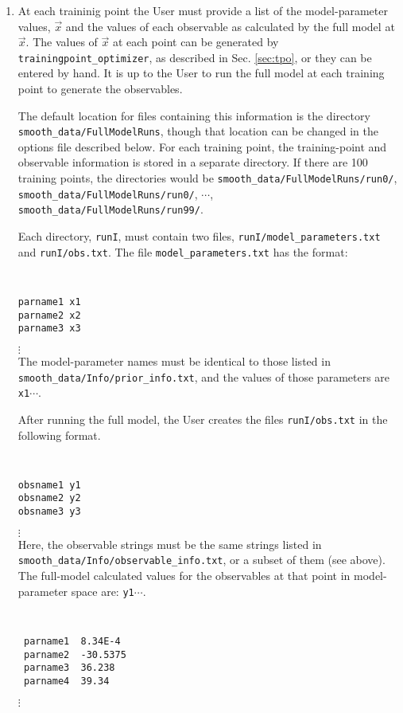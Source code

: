 \documentclass[UserManual.tex]{subfiles}
\begin{document}
\begin{enumerate}
\item At each traininig point the User must provide a list of the model-parameter values, $\vec{x}$ and the values of each observable as calculated by the full model at $\vec{x}$. The values of $\vec{x}$ at each point can be generated by {\tt trainingpoint\_optimizer}, as described in Sec. \ref{sec:tpo}, or they can be entered by hand. It is up to the User to run the full model at each training point to generate the observables.

The default location for files containing this information is the directory {\tt smooth\_data/FullModelRuns}, though that location can be changed in the options file described below. For each training point, the training-point and observable information is stored in a separate directory. If there are 100 training points, the directories would be {\tt smooth\_data/FullModelRuns/run0/}, {\tt smooth\_data/FullModelRuns/run0/}, $\cdots$, {\tt smooth\_data/FullModelRuns/run99/}.

Each directory, {\tt runI}, must contain two files, {\tt runI/model\_parameters.txt} and {\tt runI/obs.txt}. The file {\tt model\_parameters.txt} has the format:\\ 
{\tt
\begin{verbatim}
parname1 x1  
parname2 x2  
parname3 x3  
\end{verbatim}}
\vspace*{-16pt}
 \hspace*{28pt}$\vdots$\\
The model-parameter names must be identical to those listed in {\tt smooth\_data/Info/prior\_info.txt}, and the values of those parameters are {\tt x1}$\cdots$.

After running the full model, the User creates the files {\tt runI/obs.txt} in the following format. 
{\tt
\begin{verbatim}
obsname1 y1 
obsname2 y2
obsname3 y3  
\end{verbatim}}
\vspace*{-16pt}
 \hspace*{28pt}$\vdots$\\
Here, the observable strings must be the same strings listed in {\tt smooth\_data/Info/observable\_info.txt}, or a subset of them (see above). The full-model calculated values for the observables at that point in model-parameter space are: {\tt y1}$\cdots$. 

{\tt
\begin{verbatim}
 parname1  8.34E-4
 parname2  -30.5375
 parname3  36.238
 parname4  39.34
\end{verbatim}}
\vspace*{-16pt}
 \hspace*{28pt}$\vdots$\\



\end{enumerate}
\end{document}

